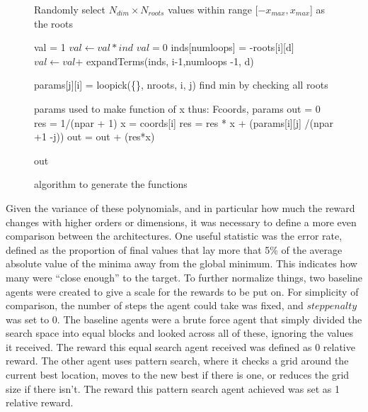 \begin{figure}
\begin{algorithmic}
\State Randomly select  $N_{dim}\times N_{roots}$ values within range [$-x_{max}, x_{max}$] as the roots

               \State val = 1
                    \State$ val \gets val*ind$
                \EndFor
               \State {}
            \Else
                \State $val = 0$
                    \State inds[numloops] = -roots[i][d]  
                    \State$ val \gets val $+ expandTerms(inds, i-1,numloops -1, d) 
                \EndFor
                \State {}
            \EndIf
      \EndFunction
        
            \State params[j][i] = loopick(\{\}, nroots, i, j)
        \EndFor
    \EndFor
   \State find min by checking all roots
    
  \State params used to make function of x thus:
  \Function F{coords, params}
    \State out = 0
         \State res = 1/(npar + 1) 
        \State x = coords[i]
              \State res = res * x + (params[i][j] /(npar +1 -j))
	    \EndFor
	   \State out =  out + (res*x)
    \EndFor

    \Return out
\EndFunction
\end{algorithmic}
\caption{algorithm to generate the functions}
\label{alg:functiongen}
\end{figure}

Given the variance of these polynomials, and in particular how much the reward changes with higher orders or dimensions, it was necessary to define a more even comparison between the architectures. One useful statistic was the error rate, defined as the proportion of final values that lay more that 5\% of the average absolute value of the minima away from the global minimum. This indicates how many were ``close enough'' to the target. To further normalize things, two baseline agents were created to give a scale for the rewards to be put on. For simplicity of comparison, the number of steps the agent could take was fixed, and $steppenalty$ was set to 0. The baseline agents were a brute force agent that simply divided the search space into equal blocks and looked across all of these, ignoring the values it received. The reward this equal search agent received was defined as 0 relative reward. The other agent uses pattern search, where it checks a grid around the current best location, moves to the new best if there is one, or reduces the grid size if there isn't. The reward this pattern search agent achieved was set as 1 relative reward.


